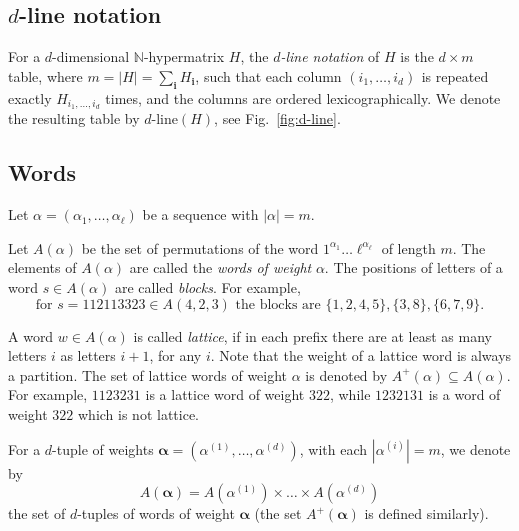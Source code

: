 \documentclass[12pt, reqno]{amsart}
\theoremstyle{definition}
\begin{document}
\subsection{$d$-line notation} For a $d$-dimensional $\mathbb{N}$-hypermatrix $H$, the \textit{$d$-line notation} of $H$ is the $d \times m$ table, where $m = |H| =  \sum_{\mathbf{i}} H_{\mathbf{i}}$, such that each column $(i_1,\ldots, i_d)^{}$ is repeated exactly $H_{i_1,\ldots,i_d}$ times, and
the columns are ordered lexicographically. 
We denote the resulting table by $d\text{-line}(H)$, see Fig.~\ref{fig:d-line}.

\subsection{Words}
Let $\alpha = (\alpha_1,\ldots,\alpha_\ell)$ be a sequence with $|\alpha| = m$. 

Let $A(\alpha)$ be the set of permutations of the word $1^{\alpha_1}\ldots \ell^{\alpha_\ell}$ of length $m$. The elements of $A(\alpha)$ are called the \textit{words of weight} $\alpha$. The positions of letters of a word $s \in A(\alpha)$ are called \textit{blocks}. For example, 
$$
    \text{for }s = 112113323 \in A(4,2,3) \text{ the blocks are }\{1,2,4,5\},\{3, 8\},\{6, 7, 9\}.
$$

A word $w\in A(\alpha)$ is called \textit{lattice}, if in each prefix there are at least as many letters $i$ as letters $i+1$, for any $i$. Note that the weight of a lattice word is always a partition. The set of lattice words of weight $\alpha$ is denoted by 
$A^{+}(\alpha) \subseteq A(\alpha)$. For example, $1123231$ is a lattice word of weight $322$, while $1232131$ is a word of weight $322$ which is not lattice.

For a $d$-tuple of weights $\pmb{\alpha} = (\alpha^{(1)},\ldots,\alpha^{(d)})$, with each $|\alpha^{(i)}| = m$, we denote by
$$A(\pmb{\alpha}) = A(\alpha^{(1)}) \times\ldots\times A(\alpha^{(d)})$$
the set of $d$-tuples of words of weight $\pmb{\alpha}$ (the set $A^+(\pmb{\alpha})$ is defined similarly).
\end{document}
